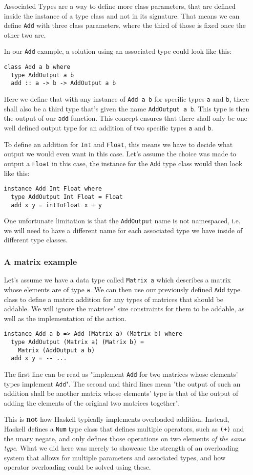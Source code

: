 Associated Types are a way to define more class parameters, that are defined inside the instance of a type class and not in its signature. That means we can define \verb|Add| with three class parameters, where the third of those is fixed once the other two are.

In our \verb|Add| example, a solution using an associated type could look like this:
\begin{verbatim}
class Add a b where
  type AddOutput a b
  add :: a -> b -> AddOutput a b
\end{verbatim}
Here we define that with any instance of \verb|Add a b| for specific types \verb|a| and \verb|b|, there shall also be a third type that's given the name \verb|AddOutput a b|. This type is then the output of our \verb|add| function. This concept ensures that there shall only be one well defined output type for an addition of two specific types \verb|a| and \verb|b|.

To define an addition for \verb|Int| and \verb|Float|, this means we have to decide what output we would even want in this case. Let's assume the choice was made to output a \verb|Float| in this case, the instance for the \verb|Add| type class would then look like this:
\begin{verbatim}
instance Add Int Float where
  type AddOutput Int Float = Float
  add x y = intToFloat x + y
\end{verbatim}
One unfortunate limitation is that the \verb|AddOutput| name is not namespaced, i.e. we will need to have a different name for each associated type we have inside of different type classes.

\subsubsection{A matrix example}

Let's assume we have a data type called \verb|Matrix a| which describes a matrix whose elements are of type \verb|a|. We can then use our previously defined \verb|Add| type class to define a matrix addition for any types of matrices that should be addable. We will ignore the matrices' size constraints for them to be addable, as well as the implementation of the action.
\begin{verbatim}
instance Add a b => Add (Matrix a) (Matrix b) where
  type AddOutput (Matrix a) (Matrix b) =
    Matrix (AddOutput a b)
  add x y = -- ...
\end{verbatim}
The first line can be read as "implement \verb|Add| for two matrices whose elements' types implement \verb|Add|". The second and third lines mean "the output of such an addition shall be another matrix whose elements' type is that of the output of adding the elements of the original two matrices together".

This is \textbf{not} how Haskell typically implements overloaded addition. Instead, Haskell defines a \verb|Num| type class that defines multiple operators, such as \verb|(+)| and the unary negate, and only defines those operations on two elements \textit{of the same type}. What we did here was merely to showcase the strength of an overloading system that allows for multiple parameters and associated types, and how operator overloading could be solved using these.
